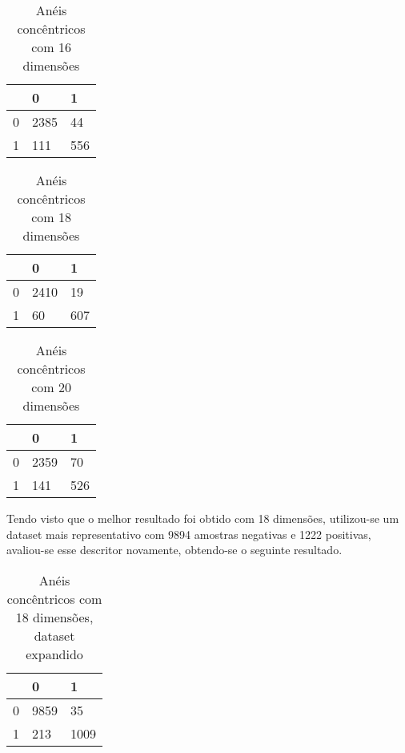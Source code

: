 \begin{table}[h]
\centering
\caption{Anéis concêntricos com 16 dimensões}
\begin{tabular}{l|l|l|}
\cline{2-3}
                        & 0 & 1 \\ \hline
\multicolumn{1}{|l|}{0} & 2385 & 44 \\ \hline
\multicolumn{1}{|l|}{1} & 111 & 556 \\ \hline
\end{tabular}
\end{table}

\begin{table}[h]
\centering
\caption{Anéis concêntricos com 18 dimensões}
\begin{tabular}{l|l|l|}
\cline{2-3}
                        & 0 & 1 \\ \hline
\multicolumn{1}{|l|}{0} & 2410 & 19 \\ \hline
\multicolumn{1}{|l|}{1} & 60 & 607 \\ \hline
\end{tabular}
\end{table}

\begin{table}[h]
\centering
\caption{Anéis concêntricos com 20 dimensões}
\begin{tabular}{l|l|l|}
\cline{2-3}
                        & 0 & 1 \\ \hline
\multicolumn{1}{|l|}{0} & 2359 & 70 \\ \hline
\multicolumn{1}{|l|}{1} & 141 & 526 \\ \hline
\end{tabular}
\end{table}

Tendo visto que o melhor resultado foi obtido com 18 dimensões, utilizou-se um dataset mais representativo com 9894 amostras negativas e 1222 positivas, avaliou-se esse descritor novamente, obtendo-se o seguinte resultado.

\begin{table}[h!]
\centering
\caption{Anéis concêntricos com 18 dimensões, dataset expandido}
\begin{tabular}{l|l|l|}
\cline{2-3}
                        & 0 & 1 \\ \hline
\multicolumn{1}{|l|}{0} & 9859 & 35 \\ \hline
\multicolumn{1}{|l|}{1} & 213 & 1009 \\ \hline
\end{tabular}
\end{table}
